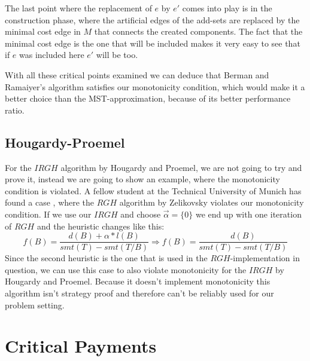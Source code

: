 The last point where the replacement of $e$ by $e'$ comes into play is in the construction phase, where the artificial edges of the add-sets are replaced by the minimal cost edge in $M$ that connects the created components. The fact that the minimal cost edge is the one that will be included makes it very easy to see that if $e$ was included here $e'$ will be too.

With all these critical points examined we can deduce that Berman and Ramaiyer's algorithm satisfies our monotonicity condition, which would make it a better choice than the MST-approximation, because of its better performance ratio. 
\subsection{Hougardy-Proemel}

For the $IRGH$ algorithm by Hougardy and Proemel, we are not going to try and prove it, instead we are going to show an example, where the monotonicity condition is violated. A fellow student at the Technical University of Munich has found a case \cite{guggenbichler20}, where the $RGH$ algorithm by Zelikovsky \cite{zelikovsky1996better} violates our monotonicity condition. If we use our $IRGH$ and choose $\vec{\alpha}=\{ 0\}$ we end up with one iteration of $RGH$ and the heuristic changes like this: 
$$f(B) = \frac{d(B) + \alpha * l(B)}{smt(T)-smt(T/B)} \Rightarrow f(B) = \frac{d(B)}{smt(T)-smt(T/B)}$$
Since the second heuristic is the one that is used in the $RGH$-implementation in question, we can use this case to also violate monotonicity for the $IRGH$ by Hougardy and Proemel. Because it doesn't implement monotonicity this algorithm isn't strategy proof and therefore can't be reliably used for our problem setting. 

\section{Critical Payments}

